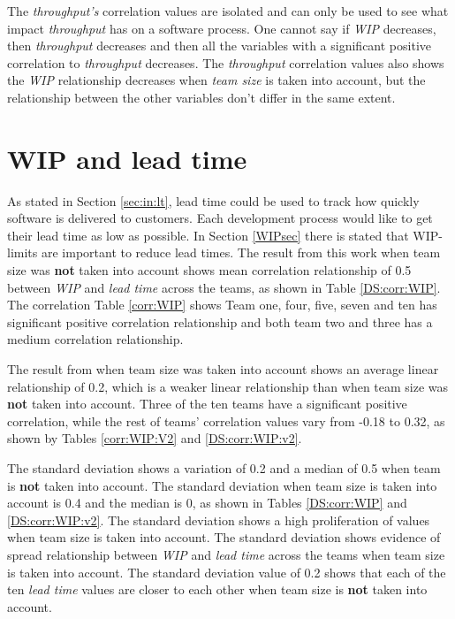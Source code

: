 \documentclass[UKenglish]{ifimaster}  %
\begin{document}
The \textit{throughput's} correlation values are isolated and can only be used to see what impact \textit{throughput} has on a software process. One cannot say if \textit{WIP} decreases, then \textit{throughput} decreases and then all the variables with a significant positive correlation to \textit{throughput} decreases. The \textit{throughput} correlation values also shows the \textit{WIP} relationship decreases when \textit{team size} is taken into account, but the relationship between the other variables don't differ in the same extent.




\section{WIP and lead time}
\vspace{-1em}
As stated in Section \ref{sec:in:lt}, lead time could be used to track how quickly software is delivered to customers. Each development process would like to get their lead time as low as possible. In Section \ref{WIPsec} there is stated that WIP-limits are important to reduce lead times. The result from this work when team size was \textbf{not} taken into account shows mean correlation relationship of 0.5 between \textit{WIP} and \textit{lead time} across the teams,  as shown in Table \ref{DS:corr:WIP}.  The correlation Table \ref{corr:WIP} shows Team one, four, five, seven and ten has significant positive correlation relationship and both team two and three has a medium correlation relationship.

The result from when team size was taken into account shows an average linear relationship of 0.2, which is a weaker linear relationship than when team size was \textbf{not} taken into account. Three of the ten teams have a significant positive correlation, while the rest of teams' correlation values vary from -0.18 to 0.32, as shown by Tables \ref{corr:WIP:V2} and \ref{DS:corr:WIP:v2}. 

The standard deviation shows a variation of 0.2 and a median of 0.5 when team is \textbf{not} taken into account. The standard deviation when team size is taken into account is 0.4 and the median is 0, as shown in Tables  \ref{DS:corr:WIP} and \ref{DS:corr:WIP:v2}. The standard deviation shows a high proliferation of values when team size is taken into account. The standard deviation shows evidence of spread relationship between \textit{WIP} and \textit{lead time} across the teams  when team size is taken into account.   The standard deviation value of 0.2 shows that  each of the ten \textit{lead time} values are closer to each other when team size is \textbf{not} taken into account.  
\end{document}
